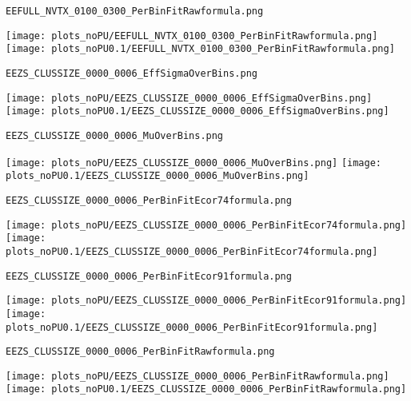 \begin{frame}[fragile]
\begin{verbatim}
EEFULL_NVTX_0100_0300_PerBinFitRawformula.png
\end{verbatim}
\texttt{[image: plots\_noPU/EEFULL\_NVTX\_0100\_0300\_PerBinFitRawformula.png]}
\texttt{[image: plots\_noPU0.1/EEFULL\_NVTX\_0100\_0300\_PerBinFitRawformula.png]}
\end{frame}
\begin{frame}[fragile]
\begin{verbatim}
EEZS_CLUSSIZE_0000_0006_EffSigmaOverBins.png
\end{verbatim}
\texttt{[image: plots\_noPU/EEZS\_CLUSSIZE\_0000\_0006\_EffSigmaOverBins.png]}
\texttt{[image: plots\_noPU0.1/EEZS\_CLUSSIZE\_0000\_0006\_EffSigmaOverBins.png]}
\end{frame}
\begin{frame}[fragile]
\begin{verbatim}
EEZS_CLUSSIZE_0000_0006_MuOverBins.png
\end{verbatim}
\texttt{[image: plots\_noPU/EEZS\_CLUSSIZE\_0000\_0006\_MuOverBins.png]}
\texttt{[image: plots\_noPU0.1/EEZS\_CLUSSIZE\_0000\_0006\_MuOverBins.png]}
\end{frame}
\begin{frame}[fragile]
\begin{verbatim}
EEZS_CLUSSIZE_0000_0006_PerBinFitEcor74formula.png
\end{verbatim}
\texttt{[image: plots\_noPU/EEZS\_CLUSSIZE\_0000\_0006\_PerBinFitEcor74formula.png]}
\texttt{[image: plots\_noPU0.1/EEZS\_CLUSSIZE\_0000\_0006\_PerBinFitEcor74formula.png]}
\end{frame}
\begin{frame}[fragile]
\begin{verbatim}
EEZS_CLUSSIZE_0000_0006_PerBinFitEcor91formula.png
\end{verbatim}
\texttt{[image: plots\_noPU/EEZS\_CLUSSIZE\_0000\_0006\_PerBinFitEcor91formula.png]}
\texttt{[image: plots\_noPU0.1/EEZS\_CLUSSIZE\_0000\_0006\_PerBinFitEcor91formula.png]}
\end{frame}
\begin{frame}[fragile]
\begin{verbatim}
EEZS_CLUSSIZE_0000_0006_PerBinFitRawformula.png
\end{verbatim}
\texttt{[image: plots\_noPU/EEZS\_CLUSSIZE\_0000\_0006\_PerBinFitRawformula.png]}
\texttt{[image: plots\_noPU0.1/EEZS\_CLUSSIZE\_0000\_0006\_PerBinFitRawformula.png]}
\end{frame}
